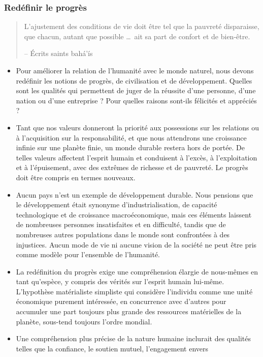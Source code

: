 \documentclass[11pt,xcolor={dvipsnames},hyperref={pdftex,pdfpagemode=UseNone,hidelinks,pdfdisplaydoctitle=true},usepdftitle=false]{beamer}
\begin{document}
\begin{frame}[allowframebreaks=0.8]
  \frametitle{Redéfinir le progrès}
  \begin{quote}
    L’ajustement des conditions de vie doit être tel que la pauvreté
    disparaisse, que chacun, autant que possible \ldots\ ait sa part de confort
    et de bien-être.

    \raggedleft -- Écrits saints bahá’ís
  \end{quote}
  \begin{itemize}
    \item Pour améliorer la relation de l'humanité avec le monde naturel, nous
      devons redéfinir les notions de progrès, de civilisation et de
      développement. Quelles sont les qualités qui permettent de juger de la
      réussite d'une personne, d'une nation ou d'une entreprise ? Pour quelles
      raisons sont-ils félicités et appréciés ?
    \item Tant que nos valeurs donneront la priorité aux possessions sur les
      relations ou à l'acquisition sur la responsabilité, et que nous attendrons
      une croissance infinie sur une planète finie, un monde durable restera
      hors de portée. De telles valeurs affectent l'esprit humain et conduisent
      à l'excès, à l'exploitation et à l'épuisement, avec des extrêmes de
      richesse et de pauvreté. Le progrès doit être compris en termes nouveaux.
    \item Aucun pays n'est un exemple de développement durable. Nous pensions
      que le développement était synonyme d'industrialisation, de capacité
      technologique et de croissance macroéconomique, mais ces éléments laissent
      de nombreuses personnes insatisfaites et en difficulté, tandis que de
      nombreuses autres populations dans le monde sont confrontées à des
      injustices. Aucun mode de vie ni aucune vision de la société ne peut être
      pris comme modèle pour l'ensemble de l'humanité.
    \item La redéfinition du progrès exige une compréhension élargie de
      nous-mêmes en tant qu'espèce, y compris des vérités sur l'esprit humain
      lui-même. L'hypothèse matérialiste simpliste qui considère l'individu
      comme une unité économique purement intéressée, en concurrence avec
      d'autres pour accumuler une part toujours plus grande des ressources
      matérielles de la planète, sous-tend toujours l'ordre mondial.
    \item Une compréhension plus précise de la nature humaine inclurait des
      qualités telles que la confiance, le soutien mutuel, l'engagement envers

\end{itemize}
\end{frame}
\end{document}
